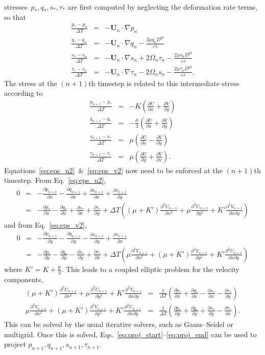 \documentclass[11pt]{article}
\newcommand{\p}{\partial}
\newcommand{\prx}[1]{\frac{\p #1}{\p x}}
\newcommand{\pry}[1]{\frac{\p #1}{\p y}}
\newcommand{\Dpl}{D^\textrm{pl}}
\renewcommand{\vec}[1]{\mathbf{#1}}
\renewcommand{\epsilon}{\varepsilon}
\begin{document}
stresses~$p_*,q_*,s_*,\tau_*$ are first computed by neglecting the deformation
rate terms, so that
\begin{eqnarray}
  \frac{p_*-p_n}{\Delta T} &=& -\vec{U}_n\cdot\nabla p_n \\
  \frac{q_*-q_n}{\Delta T} &=& -\vec{U}_n\cdot\nabla q_n-\frac{2\mu q_n \Dpl}{\epsilon\bar{s}}\\  
  \frac{s_*-s_n}{\Delta T} &=& -\vec{U}_n\cdot\nabla s_n + 2\Omega_n \tau_n -\frac{2\mu s_n \Dpl}{\epsilon\bar{s}} \\
  \frac{\tau_*-\tau_n}{\Delta T} &=& -\vec{U}_n\cdot\nabla \tau_n - 2\Omega_n s_n -\frac{2\mu \tau_n \Dpl}{\epsilon\bar{s}}.
\end{eqnarray}
The stress at the $(n+1)$th timestep is related to this intermediate stress
according to
\begin{eqnarray}
  \label{eq:proj_start} \frac{p_{n+1}-p_*}{\Delta T} &=& - K \left(\prx{U} +\pry{V}\right) \\
  \frac{q_{n+1}-q_*}{\Delta T} &=& - \frac{\mu}{3} \left(\prx{U} +\pry{V}\right) \\
  \frac{s_{n+1}-s_*}{\Delta T} &=& \mu \left( \prx{U} - \pry{V} \right)  \\
  \label{eq:proj_end} \frac{\tau_{n+1}-\tau_*}{\Delta T} &=& \mu \left( \pry{U} + \prx{V} \right).
\end{eqnarray}
Equations~\ref{eq:eps_u2}~\&~\ref{eq:eps_v2} now need to be enforced at the
$(n+1)$th timestep. From Eq.~\ref{eq:eps_u2},
\begin{eqnarray*}
  0 &=& -\prx{p_{n+1}}-\prx{q_{n+1}}+\prx{s_{n+1}}+\pry{\tau_{n+1}}\\
  &=& -\prx{p_*}-\prx{q_*}+\prx{s_*}+\pry{\tau_*} +\Delta T \left( (\mu+K') \frac{\p^2 U_{n+1}}{\p x^2} + \mu \frac{\p^2 U_{n+1}}{\p y^2} + K' \frac{\p^2 V_{n+1}}{\p x \p y} \right)
\end{eqnarray*}
and from Eq.~\ref{eq:eps_v2},
\begin{eqnarray*}
  0 &=& -\pry{p_{n+1}}-\pry{q_{n+1}}-\pry{s_{n+1}}+\prx{\tau_{n+1}}\\
  &=& -\pry{p_*}-\pry{q_*}-\pry{s_*}+\prx{\tau_*} +\Delta T \left( \mu \frac{\p^2 V_{n+1}}{\p x^2} + (\mu+K') \frac{\p^2 V_{n+1}}{\p y^2} + K' \frac{\p^2 U_{n+1}}{\p x \p y} \right)
\end{eqnarray*}
where $K'=K+\frac{\mu}{3}$. This leads to a coupled elliptic problem
for the velocity components,
\begin{eqnarray}
  \label{eq:double_multi1} (\mu+K') \frac{\p^2 U_{n+1}}{\p x^2} + \mu \frac{\p^2 U_{n+1}}{\p y^2} + K' \frac{\p^2 V_{n+1}}{\p x \p y} &=& \frac{1}{\Delta T} \left(\prx{p_*}+\prx{q_*}-\prx{s_*}-\pry{\tau_*}\right) \\
  \label{eq:double_multi2} \mu \frac{\p^2 V_{n+1}}{\p x^2} + (\mu+K') \frac{\p^2 V_{n+1}}{\p y^2} + K' \frac{\p^2 U_{n+1}}{\p x \p y}&=& \frac{1}{\Delta T} \left( \pry{p_*}+\pry{q_*}+\pry{s_*}-\prx{\tau_*} \right).
\end{eqnarray}
This can be solved by the usual iterative solvers, such as Gauss--Seidel or
multigrid. Once this is solved, Eqs.~\ref{eq:proj_start}--\ref{eq:proj_end} can
be used to project $p_{n+1}, q_{n+1}, s_{n+1}, \tau_{n+1}$.
\end{document}
